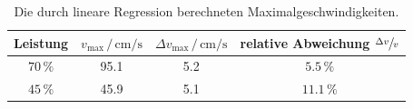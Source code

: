 \begin{table}
    \centering
    \caption{Die durch lineare Regression berechneten Maximalgeschwindigkeiten.}
    \label{tab:Regr}
    \begin{tabular}{c c c c}
        \toprule
        Leistung & $v_\text{max}\,/\,\si{\centi\meter\per\second}$ & $\Delta v_\text{max}\,/\,\si{\centi\meter\per\second}$ & relative Abweichung $\sfrac{\Delta v}{v}$ \\
        \midrule
        $70\,\%$ & 95.1 & 5.2 & $5.5\,\%$ \\
        $45\,\%$ & 45.9 & 5.1 & $11.1\,\%$ \\
        \toprule
    \end{tabular}
\end{table}